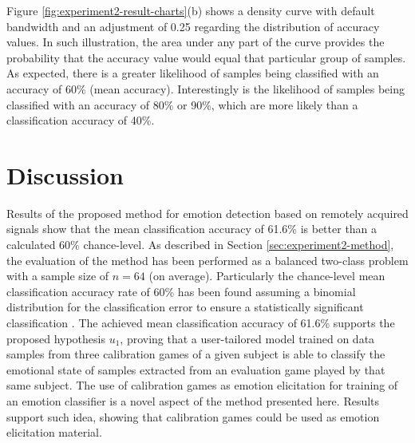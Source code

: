 Figure \ref{fig:experiment2-result-charts}(b) shows a density curve with default bandwidth and an adjustment of 0.25 regarding the distribution of accuracy values. In such illustration, the area under any part of the curve provides the probability that the accuracy value would equal that particular group of samples. As expected, there is a greater likelihood of samples being classified with an accuracy of 60\% (mean accuracy). Interestingly is the likelihood of samples being classified with an accuracy of 80\% or 90\%, which are more likely than a classification accuracy of 40\%.


\section{Discussion}

Results of the proposed method for emotion detection based on remotely acquired signals show that the mean classification accuracy of 61.6\% is better than a calculated 60\% chance-level. As described in Section \ref{sec:experiment2-method}, the evaluation of the method has been performed as a balanced two-class problem with a sample size of $n=64$ (on average). Particularly the chance-level mean classification accuracy rate of 60\% has been found assuming a binomial distribution for the classification error to ensure a statistically significant classification \parencite{combrisson2015exceeding}. The achieved mean classification accuracy of 61.6\% supports the proposed hypothesis $u_1$, proving that a user-tailored model trained on data samples from three calibration games of a given subject is able to classify the emotional state of samples extracted from an evaluation game played by that same subject. The use of calibration games as emotion elicitation for training of an emotion classifier is a novel aspect of the method presented here. Results support such idea, showing that calibration games could be used as emotion elicitation material.

